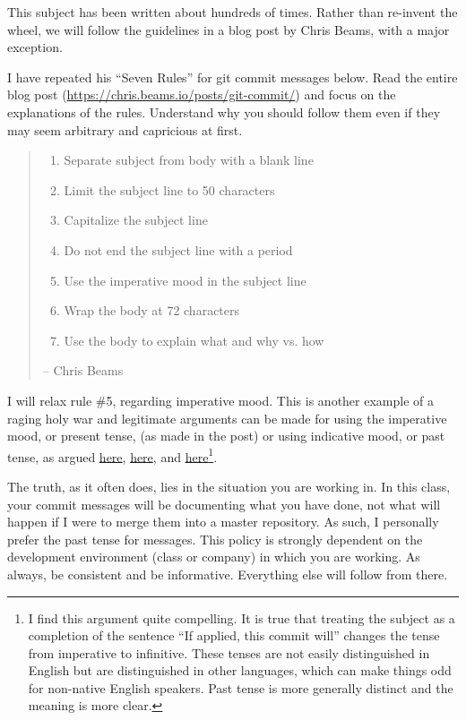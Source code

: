 This subject has been written about hundreds of times.  Rather than re-invent the wheel, we will follow the guidelines in a blog post by Chris Beams, with a major exception.

I have repeated his ``Seven Rules'' for git commit messages below.  Read the entire blog post (\url{https://chris.beams.io/posts/git-commit/}) and focus on the explanations of the rules.  Understand why you should follow them even if they may seem arbitrary and capricious at first.

\begin{quote}
    \begin{enumerate}
        \item Separate subject from body with a blank line
        \item Limit the subject line to 50 characters
        \item Capitalize the subject line
        \item Do not end the subject line with a period
        \item Use the imperative mood in the subject line
        \item Wrap the body at 72 characters
        \item Use the body to explain what and why vs. how
    \end{enumerate}
    -- Chris Beams\cite{Beams2014}
\end{quote}

I will relax rule \#5, regarding imperative mood.  This is another example of a raging holy war and legitimate arguments can be made for using the imperative mood, or present tense, (as made in the post) or using indicative mood, or past tense, as argued \href{https://stackoverflow.com/a/8059167}{here}, \href{http://disq.us/p/1rxy1py}{here}, and \href{http://disq.us/p/1r4bwo7}{here}\footnote{I find this argument quite compelling.  It is true that treating the subject as a completion of the sentence ``If applied, this commit will'' changes the tense from imperative to infinitive.  These tenses are not easily distinguished in English but are distinguished in other languages, which can make things odd for non-native English speakers.  Past tense is more generally distinct and the meaning is more clear.}.

The truth, as it often does, lies in the situation you are working in.  In this class, your commit messages will be documenting what  you have done, not what will happen if I were to merge them into a master repository.  As such, I personally prefer the past tense for messages.  This policy is strongly dependent on the development environment (class or company) in which you are working.  As always, be consistent and be informative.  Everything else will follow from there.
